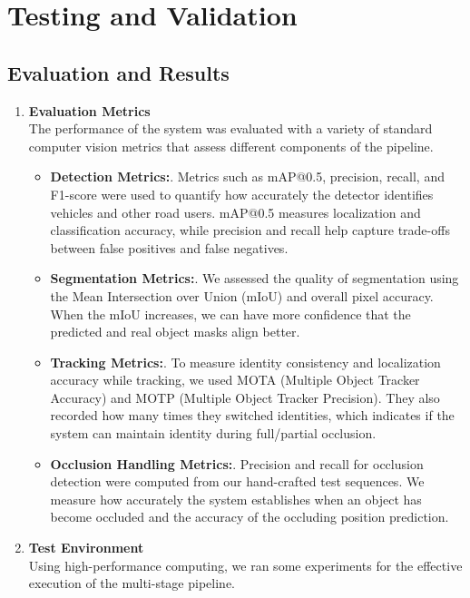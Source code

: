 \documentclass[12pt,a4paper]{report}
\theoremstyle{definition}
\theoremstyle{remark}
\begin{document}
\section{Testing and Validation}
\subsection{Evaluation and Results}

\begin{enumerate}

    \item \textbf{Evaluation Metrics}\\
    The performance of the system was evaluated with a variety of standard computer vision metrics that assess different components of the pipeline.

\begin{itemize}
\item \textbf{Detection Metrics:}.
Metrics such as mAP@0.5, precision, recall, and F1-score were used to quantify how accurately the detector identifies vehicles and other road users.
mAP@0.5 measures localization and classification accuracy, while precision and recall help capture trade-offs between false positives and false negatives.

\item \textbf{Segmentation Metrics:}.
We assessed the quality of segmentation using the Mean Intersection over Union (mIoU) and overall pixel accuracy.
When the mIoU increases, we can have more confidence that the predicted and real object masks align better.

\item \textbf{Tracking Metrics:}.
To measure identity consistency and localization accuracy while tracking, we used MOTA (Multiple Object Tracker Accuracy) and MOTP (Multiple Object Tracker Precision).
They also recorded how many times they switched identities, which indicates if the system can maintain identity during full/partial occlusion.

\item \textbf{Occlusion Handling Metrics:}.
Precision and recall for occlusion detection were computed from our hand-crafted test sequences.
We measure how accurately the system establishes when an object has become occluded and the accuracy of the occluding position prediction.
\end{itemize}

    \item \textbf{Test Environment}\\
    Using high-performance computing, we ran some experiments for the effective execution of the multi-stage pipeline.


\end{enumerate}
\end{document}
